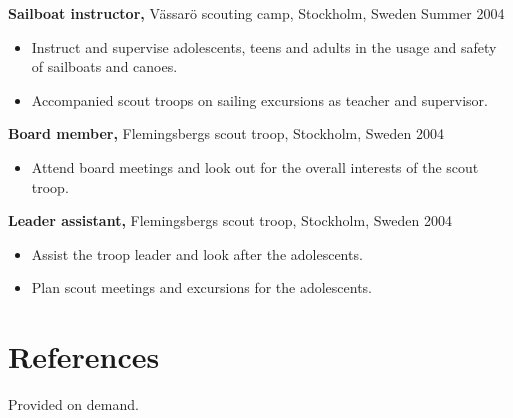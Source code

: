 \documentclass[margin]{res}
\begin{document}
\begin{resume}
{\bf Sailboat instructor,} Vässarö scouting camp, Stockholm, Sweden \hfill Summer 2004
\begin{itemize} \itemsep -2pt
\item Instruct and supervise adolescents, teens and adults in the usage and safety of sailboats and canoes.
\item Accompanied scout troops on sailing excursions as teacher and supervisor.
\end{itemize}

{\bf Board member,} Flemingsbergs scout troop, Stockholm, Sweden \hfill 2004
\begin{itemize} \itemsep -2pt
\item Attend board meetings and look out for the overall interests of the scout troop.
\end{itemize}
{\bf Leader assistant,} Flemingsbergs scout troop, Stockholm, Sweden \hfill 2004
\begin{itemize} \itemsep -2pt
\item Assist the troop leader and look after the adolescents.
\item Plan scout meetings and excursions for the adolescents.
\end{itemize}

\section{References}
Provided on demand.

\end{resume}
\end{document}
